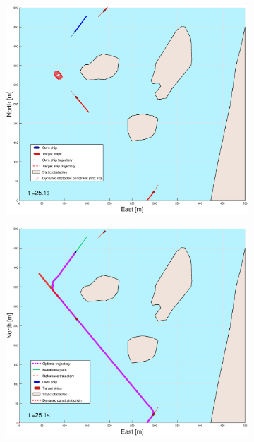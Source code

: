 \begin{figure}[!b]
\begin{subfigure}[b]{0.499\textwidth}
    \end{subfigure}
    \hfill
    \\
    \begin{subfigure}[b]{0.49\textwidth}
        \centering
        \includegraphics[width=\textwidth]{Images/Figures/Helloya_Rev/_Simple_1fig1_time=25}
    \end{subfigure}
    \hfill
    \begin{subfigure}[b]{0.499\textwidth}
        \centering
        \includegraphics[width=\textwidth]{Images/Figures/Helloya_Rev/_Simple_1fig999_time=25}

\end{subfigure}
\end{figure}
